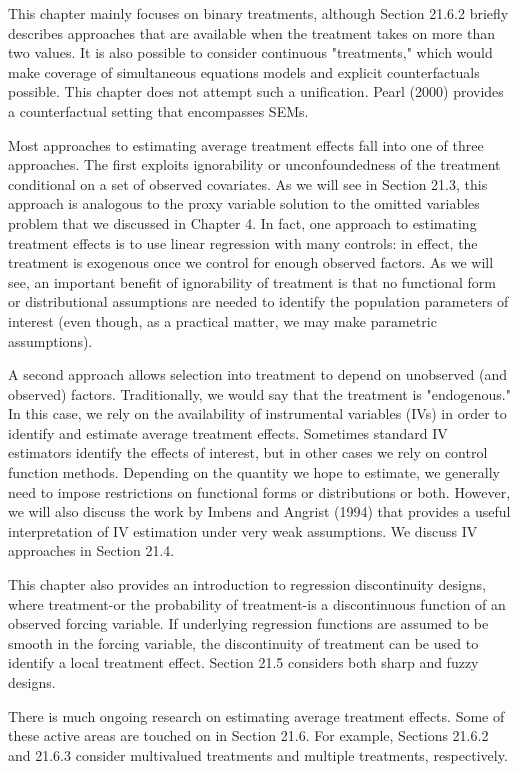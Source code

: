 \documentclass[10pt]{article}
\begin{document}
This chapter mainly focuses on binary treatments, although Section 21.6.2 briefly describes approaches that are available when the treatment takes on more than two values. It is also possible to consider continuous "treatments," which would make coverage of simultaneous equations models and explicit counterfactuals possible. This chapter does not attempt such a unification. Pearl (2000) provides a counterfactual setting that encompasses SEMs.

Most approaches to estimating average treatment effects fall into one of three approaches. The first exploits ignorability or unconfoundedness of the treatment conditional on a set of observed covariates. As we will see in Section 21.3, this approach is analogous to the proxy variable solution to the omitted variables problem that we discussed in Chapter 4. In fact, one approach to estimating treatment effects is to use linear regression with many controls: in effect, the treatment is exogenous once we control for enough observed factors. As we will see, an important benefit of ignorability of treatment is that no functional form or distributional assumptions are needed to identify the population parameters of interest (even though, as a practical matter, we may make parametric assumptions).

A second approach allows selection into treatment to depend on unobserved (and observed) factors. Traditionally, we would say that the treatment is "endogenous." In this case, we rely on the availability of instrumental variables (IVs) in order to identify and estimate average treatment effects. Sometimes standard IV estimators identify the effects of interest, but in other cases we rely on control function methods. Depending on the quantity we hope to estimate, we generally need to impose restrictions on functional forms or distributions or both. However, we will also discuss the work by Imbens and Angrist (1994) that provides a useful interpretation of IV estimation under very weak assumptions. We discuss IV approaches in Section 21.4.

This chapter also provides an introduction to regression discontinuity designs, where treatment-or the probability of treatment-is a discontinuous function of an observed forcing variable. If underlying regression functions are assumed to be smooth in the forcing variable, the discontinuity of treatment can be used to identify a local treatment effect. Section 21.5 considers both sharp and fuzzy designs.

There is much ongoing research on estimating average treatment effects. Some of these active areas are touched on in Section 21.6. For example, Sections 21.6.2 and 21.6.3 consider multivalued treatments and multiple treatments, respectively.
\end{document}
